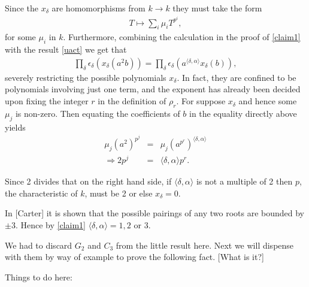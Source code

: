 Since the $x_\delta$ are homomorphisms from $k\rightarrow k$ they must take the form
\begin{eqnarray*}
T\mapsto\sum_i \mu_i T^{p^i},
\end{eqnarray*}
for some $\mu_i$ in $k$. Furthermore, combining the calculation in the proof of \ref{claim1} with the result \ref{uact} we get that
\begin{eqnarray*}
\prod_\delta \epsilon_\delta\left(x_\delta\left(a^2b\right)\right) = \prod_\delta \epsilon_\delta\left(a^{\langle \delta, \alpha \rangle}x_\delta\left(b\right)\right),
\end{eqnarray*}
severely restricting the possible polynomials $x_\delta$. In fact, they are confined to be polynomials involving just one term, and the exponent has already been decided upon fixing the integer $r$ in the definition of $\rho_r$. For suppose $x_\delta$ and hence some $\mu_j$ is non-zero. Then equating the coefficients of $b$ in the equality directly above yields
\begin{eqnarray*}
\mu_j(a^2)^{p^j} &=& \mu_j \left(a^{p^r}\right)^{\langle \delta, \alpha\rangle}\\
\Longrightarrow2p^j &=& \langle \delta, \alpha \rangle p^r.
\end{eqnarray*}

Since 2 divides that on the right hand side, if $\langle \delta, \alpha \rangle$ is not a multiple of 2 then $p$, the characteristic of $k$, must be 2 or else $x_\delta = 0$.

In [Carter] it is shown that the possible pairings of any two roots are bounded by $\pm 3$. Hence by \ref{claim1} $\langle \delta, \alpha \rangle = 1, 2$ or 3.

We had to discard $G_2$ and $C_3$ from the little result here. Next we will dispense with them by way of example to prove the following fact. [What is it?]

Things to do here:

